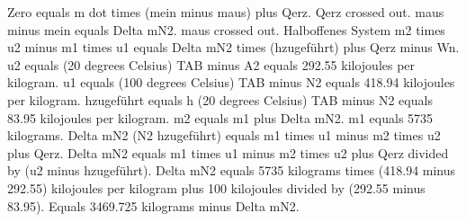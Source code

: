 Zero equals m dot times (mein minus maus) plus Qerz.
Qerz crossed out.
maus minus mein equals Delta mN2.
maus crossed out.
Halboffenes System
m2 times u2 minus m1 times u1 equals Delta mN2 times (hzugeführt) plus Qerz minus Wn.
u2 equals (20 degrees Celsius) TAB minus A2 equals 292.55 kilojoules per kilogram.
u1 equals (100 degrees Celsius) TAB minus N2 equals 418.94 kilojoules per kilogram.
hzugeführt equals h (20 degrees Celsius) TAB minus N2 equals 83.95 kilojoules per kilogram.
m2 equals m1 plus Delta mN2.
m1 equals 5735 kilograms.
Delta mN2 (N2 hzugeführt) equals m1 times u1 minus m2 times u2 plus Qerz.
Delta mN2 equals m1 times u1 minus m2 times u2 plus Qerz divided by (u2 minus hzugeführt).
Delta mN2 equals 5735 kilograms times (418.94 minus 292.55) kilojoules per kilogram plus 100 kilojoules divided by (292.55 minus 83.95).
Equals 3469.725 kilograms minus Delta mN2.